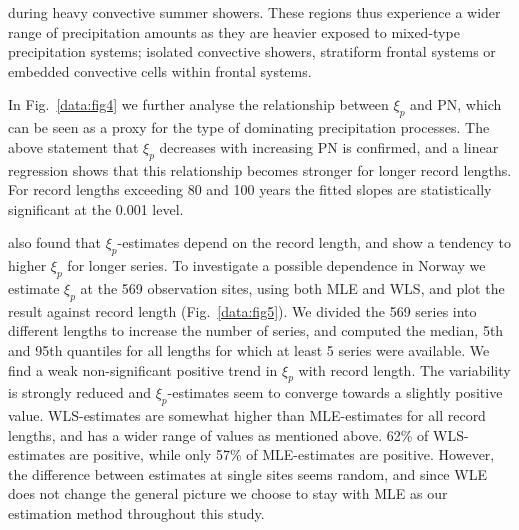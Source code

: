 \documentclass[12pt,a4paper,english]{article}
\begin{document}
during heavy convective summer showers. These regions thus experience a wider range of precipitation amounts as they are heavier exposed to mixed-type precipitation systems; isolated convective showers, stratiform frontal systems or embedded convective cells within frontal systems.

In Fig.~\ref{data:fig4} we further analyse the relationship between $\xi_{p}$ and PN, which can be seen as a proxy for the type of dominating precipitation processes. The above statement that $\xi_{p}$ decreases with increasing PN is confirmed, and a linear regression shows that this relationship becomes stronger for longer record lengths. For record lengths exceeding 80 and 100 years the fitted slopes are statistically significant at the 0.001 level.  

\cite{PapalexiouandKoutsoyiannis2012} also found that $\xi_{p}$-estimates depend on the record length, and show a tendency to higher $\xi_{p}$ for longer series. To investigate a possible dependence in Norway we estimate $\xi_{p}$ at the 569 observation sites, using both MLE and WLS, and plot the result against record length (Fig.~\ref{data:fig5}). We divided the 569 series into different lengths to increase the number of series, and computed the median, 5th and 95th quantiles for all lengths for which at least 5 series were available. We find a weak non-significant positive trend in $\xi_{p}$ with record length. The variability is strongly reduced and $\xi_{p}$-estimates seem to converge towards a slightly positive value. WLS-estimates are somewhat higher than MLE-estimates for all record lengths, and has a wider range of values as mentioned above. 62\% of WLS-estimates are positive, while only 57\% of MLE-estimates are positive. However, the difference between estimates at single sites seems random, and since WLE does not change the general picture we choose to stay with MLE as our estimation method throughout this study. 


\end{document}
